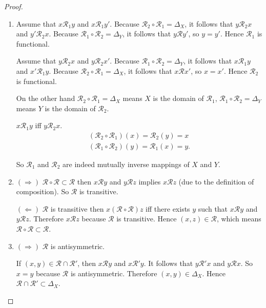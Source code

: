 \begin{proof}
    \begin{enumerate}[label={(\alph*)}]
        \item Assume that $x\mathcal{R}_{1}y$ and $x\mathcal{R}_{1}y'$. Because $\mathcal{R}_{2}\circ\mathcal{R}_{1} = \Delta_{X}$, it follows that $y\mathcal{R}_{2}x$ and $y'\mathcal{R}_{2}x$. Because $\mathcal{R}_{1}\circ\mathcal{R}_{2} = \Delta_{Y}$, it follows that $y\mathcal{R}y'$, so $y = y'$. Hence $\mathcal{R}_{1}$ is functional.

              Assume that $y\mathcal{R}_{2}x$ and $y\mathcal{R}_{2}x'$. Because $\mathcal{R}_{1}\circ\mathcal{R}_{2} = \Delta_{Y}$, it follows that $x\mathcal{R}_{1}y$ and $x'\mathcal{R}_{1}y$. Because $\mathcal{R}_{2}\circ\mathcal{R}_{1} = \Delta_{X}$, it follows that $x\mathcal{R}x'$, so $x = x'$. Hence $\mathcal{R}_{2}$ is functional.

              On the other hand $\mathcal{R}_{2}\circ\mathcal{R}_{1} = \Delta_{X}$ means $X$ is the domain of $\mathcal{R}_{1}$, $\mathcal{R}_{1}\circ\mathcal{R}_{2} = \Delta_{Y}$ means $Y$ is the domain of $\mathcal{R}_{2}$.

              $x\mathcal{R}_{1}y$ iff $y\mathcal{R}_{2}x$.
              \[
                  \begin{split}
                      (\mathcal{R}_{2}\circ\mathcal{R}_{1})(x) = \mathcal{R}_{2}(y) = x \\
                      (\mathcal{R}_{1}\circ\mathcal{R}_{2})(y) = \mathcal{R}_{1}(x) = y.
                  \end{split}
              \]

              So $\mathcal{R}_{1}$ and $\mathcal{R}_{2}$ are indeed mutually inverse mappings of $X$ and $Y$.
        \item $(\Rightarrow)$ $\mathcal{R}\circ\mathcal{R}\subset \mathcal{R}$ then $x\mathcal{R}y$ and $y\mathcal{R}z$ implies $x\mathcal{R}z$ (due to the definition of composition). So $\mathcal{R}$ is transitive.

              $(\Leftarrow)$ $\mathcal{R}$ is transitive then $x (\mathcal{R}\circ\mathcal{R}) z$ iff there exists $y$ such that $x\mathcal{R}y$ and $y\mathcal{R}z$. Therefore $x\mathcal{R}z$ because $\mathcal{R}$ is transitive. Hence $(x, z)\in \mathcal{R}$, which means $\mathcal{R}\circ\mathcal{R} \subset \mathcal{R}$.
        \item $(\Rightarrow)$ $\mathcal{R}$ is antisymmetric.

              If $(x, y)\in \mathcal{R}\cap\mathcal{R'}$, then $x\mathcal{R}y$ and $x\mathcal{R}'y$. It follows that $y\mathcal{R}'x$ and $y\mathcal{R}x$. So $x = y$ because $\mathcal{R}$ is antisymmetric. Therefore $(x, y)\in \Delta_{X}$. Hence $\mathcal{R}\cap \mathcal{R}'\subset \Delta_{X}$.


\end{enumerate}
\end{proof}

